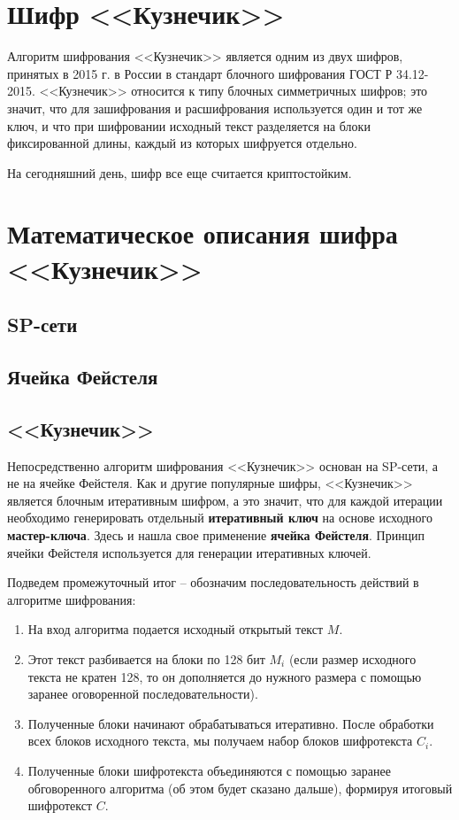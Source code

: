 \documentclass[a4paper, 12pt]{article}
\begin{document}
    \section{Шифр <<Кузнечик>>}

    Алгоритм шифрования <<Кузнечик>> является одним из двух шифров, принятых в 2015 г.
    в России в стандарт блочного шифрования ГОСТ Р 34.12-2015. <<Кузнечик>> относится
    к типу блочных симметричных шифров; это значит, что для зашифрования и
    расшифрования используется один и тот же ключ, и что при шифровании исходный текст
    разделяется на блоки фиксированной длины, каждый из которых шифруется отдельно.

    На сегодняшний день, шифр все еще считается криптостойким.

    \section{Математическое описания шифра <<Кузнечик>>}

    \subsection{SP-сети}

    \subsection{Ячейка Фейстеля}

    \subsection{<<Кузнечик>>}

    Непосредственно алгоритм шифрования <<Кузнечик>> основан на SP-сети, а не на ячейке 
    Фейстеля. Как и другие популярные шифры, <<Кузнечик>> является блочным итеративным 
    шифром, а это значит, что для каждой итерации необходимо генерировать отдельный 
    \textbf{итеративный ключ} на основе исходного \textbf{мастер-ключа}. Здесь и
    нашла свое применение \textbf{ячейка Фейстеля}. Принцип ячейки Фейстеля используется
    для генерации итеративных ключей.

    Подведем промежуточный итог -- обозначим последовательность действий в алгоритме 
    шифрования:

    \begin{enumerate}
        \item На вход алгоритма подается исходный открытый текст $M$.
        \item Этот текст разбивается на блоки по 128 бит $M_i$ (если размер исходного текста не кратен 128, то он дополняется до нужного размера с помощью заранее оговоренной последовательности).
        \item Полученные блоки начинают обрабатываться итеративно. После обработки всех блоков исходного текста, мы получаем набор блоков шифротекста $C_i$.
        \item Полученные блоки шифротекста объединяются с помощью заранее обговоренного алгоритма (об этом будет сказано дальше), формируя итоговый шифротекст $C$.
    \end{enumerate}
\end{document}
